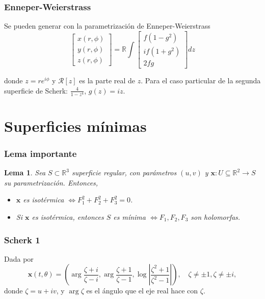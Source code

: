 \documentclass[10pt]{beamer}
\newtheorem{lema}[teorema]{Lema}
\begin{document}
  \begin{frame}
  \frametitle{Enneper-Weierstrass}
    Se pueden generar con la parametrización de Enneper-Weierstrass
  $$\left[\begin{array}{c}x(r, \phi) \\ y(r, \phi) \\ z(r, \phi)\end{array}\right]=\mathbb{R} \int\left[\begin{array}{c}f\left(1-g^2\right) \\ i f\left(1+g^2\right) \\ 2 f g\end{array}\right] d z$$

  donde $z= re^{i\phi}$ y $\mathcal{R}[z]$ es la parte real de $z$. 
  Para el caso particular de la segunda superficie de Scherk: $\frac{4}{1-z^4}$, $g(z)=iz$.
  \end{frame}

  
 \section{Superficies mínimas}

 \begin{frame}
  \frametitle{Lema importante}
  \begin{cajita}
    \begin{lema}
      Sea $S \subset \mathbb{R}^3$ superficie regular, con parámetros $(u, v)$ y $\mathbf{x}: U \subseteq \mathbb{R}^2 \rightarrow S$ su parametrización. Entonces,
      \begin{itemize}
        \item $\mathbf{x}$ es isotérmica $\Leftrightarrow F_1^2+F_2^2+F_3^2=0$.
        \item Si $\mathbf{x}$ es isotérmica, entonces $S$ es mínima $\Leftrightarrow F_1, F_2, F_3$ son holomorfas.
      \end{itemize}

    \end{lema}
  \end{cajita}

  \end{frame}
\begin{frame}
  \frametitle{Scherk 1}

  Dada por
$$
\mathbf{x}(t,\theta)=\left(\arg \frac{\zeta+i}{\zeta-i}, \arg \frac{\zeta+1}{\zeta-1}, \log \left|\frac{\zeta^2+1}{\zeta^2-1}\right|\right), \quad \zeta \neq \pm 1, \zeta \neq \pm i,
$$
donde $\zeta=u+i v$, y $\arg \zeta$ es el ángulo que el eje real hace con $\zeta$.

\end{frame}
\end{document}
